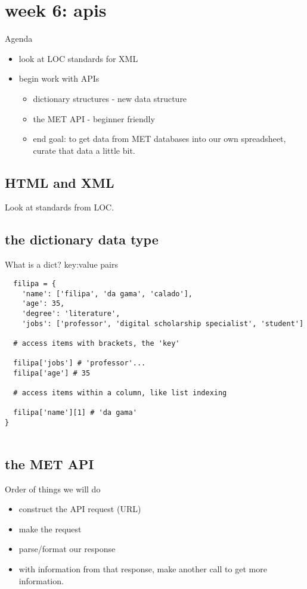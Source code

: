 \documentclass[11pt]{article}
\author{fcalado}
\date{\today}
\title{}
\begin{document}
\tableofcontents

\section{week 6: apis}
\label{sec:org363aad4}
Agenda
\begin{itemize}
\item look at LOC standards for XML
\item begin work with APIs
\begin{itemize}
\item dictionary structures - new data structure
\item the MET API - beginner friendly
\item end goal: to get data from MET databases into our own spreadsheet,
curate that data a little bit.
\end{itemize}
\end{itemize}

\subsection{HTML and XML}
\label{sec:orgce3e50f}
Look at standards from LOC.

\subsection{the dictionary data type}
\label{sec:orga9e6fe2}

What is a dict? key:value pairs

\begin{verbatim}
  filipa = {
    'name': ['filipa', 'da gama', 'calado'],
    'age': 35,
    'degree': 'literature',
    'jobs': ['professor', 'digital scholarship specialist', 'student']

  # access items with brackets, the 'key'

  filipa['jobs'] # 'professor'...
  filipa['age'] # 35

  # access items within a column, like list indexing

  filipa['name'][1] # 'da gama'
}


\end{verbatim}
\subsection{the MET API}
\label{sec:org6891e2d}
Order of things we will do
\begin{itemize}
\item construct the API request (URL)
\item make the request
\item parse/format our response
\item with information from that response, make another call to get more
information.
\end{itemize}
\end{document}
